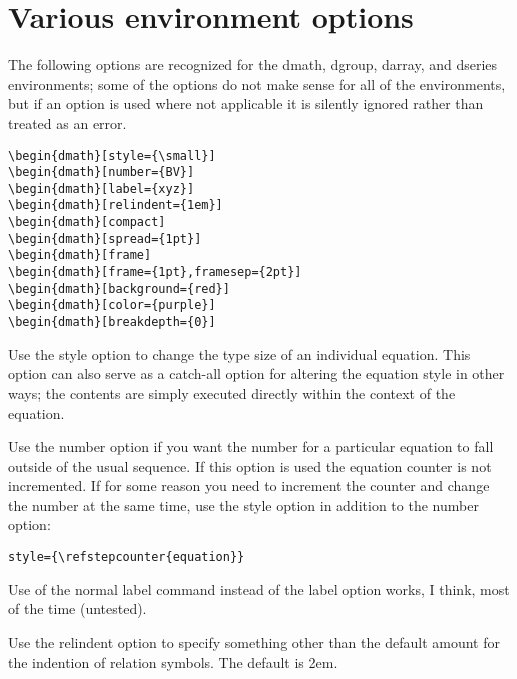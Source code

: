 \documentclass{article}
\newcommand{\ntt}{\normalfont\ttfamily}
\DeclareRobustCommand{\cs}[1]{{\ntt\ttbackslash#1}}
\let\cn=\cs
\DeclareRobustCommand{\pkg}[1]{{\ntt#1}}
\let\opt=\pkg \let\env=\pkg \let\fn=\pkg
\begin{document}
\section{Various environment options}\label{envopts}

The following options are recognized for the \env{dmath}, \env{dgroup},
\env{darray}, and \env{dseries} environments; some of the options do not
make sense for all of the environments, but if an option is used where
not applicable it is silently ignored rather than treated as an error.

\begin{verbatim}
\begin{dmath}[style={\small}]
\begin{dmath}[number={BV}]
\begin{dmath}[label={xyz}]
\begin{dmath}[relindent={1em}]
\begin{dmath}[compact]
\begin{dmath}[spread={1pt}]
\begin{dmath}[frame]
\begin{dmath}[frame={1pt},framesep={2pt}]
\begin{dmath}[background={red}]
\begin{dmath}[color={purple}]
\begin{dmath}[breakdepth={0}]
\end{verbatim}

Use the \opt{style} option to change the type size of an individual
equation. This option can also serve as a catch-all option for
altering the equation style in other ways; the contents are simply
executed directly within the context of the equation.

Use the \opt{number} option if you want the number for a particular
equation to fall outside of the usual sequence. If this option is used
the equation counter is not incremented. If for some reason you need to
increment the counter and change the number at the same time, use the
\opt{style} option in addition to the \opt{number} option:
\begin{verbatim}
style={\refstepcounter{equation}}
\end{verbatim}

Use of the normal \cn{label} command instead of the \opt{label} option
works, I think, most of the time (untested).

Use the \opt{relindent} option to specify something other than the
default amount for the indention of relation symbols. The default is
2em.
\end{document}
